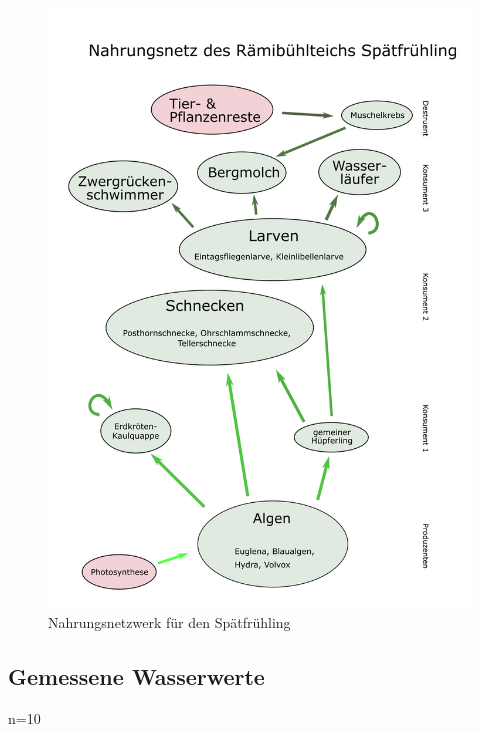 \documentclass{article}
\begin{document}
            \begin{figure}[H]
            \centering
            \includegraphics[scale=0.75]{NewNetz2.png}
            \caption{Nahrungsnetzwerk für den Spätfrühling}
            \label{fig:universe}
            \end{figure}
            
            \newpage
        
    \subsection{Gemessene Wasserwerte}

        n=10
        
\end{document}

